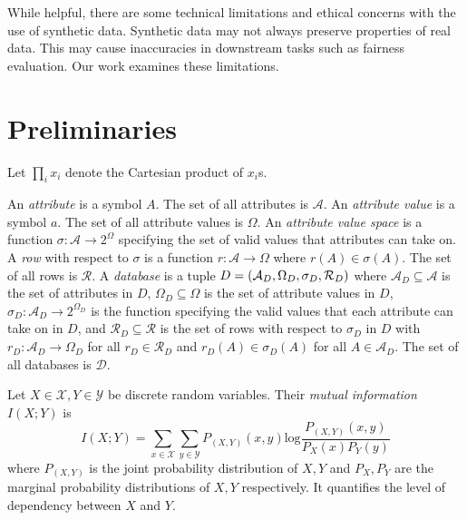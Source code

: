 \documentclass[manuscript,screen,review,anonymous]{acmart}
\DeclarePairedDelimiter{\tuple}{(}{)}
\renewcommand{\implies}{\rightarrow}
\newcommand{\db}{D}
\newcommand{\dbs}{\mathcal{D}}
\newcommand{\mi}[2]{I(#1;#2)}
\newcommand{\entropy}[1]{H(#1)}
\begin{document}
While helpful, there are some technical limitations\cite{stadler2022synthetic,cheng2021can,ganev2022robin,wyllie2024fairness} and ethical concerns\cite{whitney2024real} with the use of synthetic data. Synthetic data may not always preserve properties of real data. This may cause inaccuracies in downstream tasks such as fairness evaluation. Our work examines these limitations.

\section{Preliminaries}
\label{sec:prelim}

Let $\prod_i x_i$ denote the Cartesian product of $x_i$s.

An \emph{attribute} is a symbol $A$.
The set of all attributes is $\mathcal{A}$.
An \emph{attribute value} is a symbol $a$.
The set of all attribute values is $\Omega$.
An \emph{attribute value space} is a function $\sigma : \mathcal{A} \implies 2^{\Omega}$
specifying the set of valid values that attributes can take on.
A \emph{row} with respect to $\sigma$
is a function $r : \mathcal{A} \implies \Omega$
where $r(A) \in \sigma(A)$.
The set of all rows is $\mathcal{R}$.
A \emph{database} is a tuple $\db =
\tuple{
    \mathcal{A}_{\db},
    \Omega_{\db},
    \sigma_{\db},
    \mathcal{R}_{\db}
}$
where
$\mathcal{A}_{\db} \subseteq \mathcal{A}$
is the set of attributes in $\db$,
$\Omega_{\db} \subseteq \Omega$
is the set of attribute values in $\db$,
$\sigma_{\db} : \mathcal{A}_{\db} \implies 2^{\Omega_{\db}}$
is the function specifying the valid values that each attribute can take on in $\db$,
and $\mathcal{R}_{\db} \subseteq \mathcal{R}$
is the set of rows with respect to $\sigma_{\db}$ in $\db$
with $r_\db : \mathcal{A}_\db \implies \Omega_\db$
for all $r_\db \in \mathcal{R}_\db$
and $r_\db(A) \in \sigma_\db(A)$
for all $A \in \mathcal{A}_\db$.
The set of all databases is $\dbs$.

Let $X \in \mathcal{X},Y \in \mathcal{Y}$ be discrete random variables. Their \emph{mutual information} $\mi{X}{Y}$ is
\[
\mi{X}{Y} = \sum_{x \in \mathcal{X}} \sum_{y \in \mathcal{Y}} P_{(X,Y)}(x,y) \text{log} \frac{P_{(X,Y)}(x,y)}{P_X(x)P_Y(y)}
\]
where $P_{(X,Y)}$ is the joint probability distribution of $X,Y$ and $P_X,P_Y$ are the marginal probability distributions of $X,Y$ respectively.
It quantifies the level of dependency between $X$ and $Y$.
\end{document}
